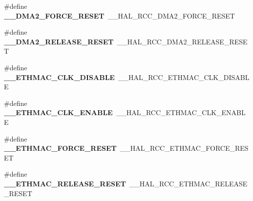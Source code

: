 \begin{DoxyCompactItemize}
\item 
\#define {\bfseries \+\_\+\+\_\+\+D\+M\+A2\+\_\+\+F\+O\+R\+C\+E\+\_\+\+R\+E\+S\+ET}~\+\_\+\+\_\+\+H\+A\+L\+\_\+\+R\+C\+C\+\_\+\+D\+M\+A2\+\_\+\+F\+O\+R\+C\+E\+\_\+\+R\+E\+S\+ET\hypertarget{group___h_a_l___r_c_c___aliased_gac4c41afd72bb5ab0fe1da7f4444ff213}{}\label{group___h_a_l___r_c_c___aliased_gac4c41afd72bb5ab0fe1da7f4444ff213}

\item 
\#define {\bfseries \+\_\+\+\_\+\+D\+M\+A2\+\_\+\+R\+E\+L\+E\+A\+S\+E\+\_\+\+R\+E\+S\+ET}~\+\_\+\+\_\+\+H\+A\+L\+\_\+\+R\+C\+C\+\_\+\+D\+M\+A2\+\_\+\+R\+E\+L\+E\+A\+S\+E\+\_\+\+R\+E\+S\+ET\hypertarget{group___h_a_l___r_c_c___aliased_gaea54267740103243fa99cba644aaffcc}{}\label{group___h_a_l___r_c_c___aliased_gaea54267740103243fa99cba644aaffcc}

\item 
\#define {\bfseries \+\_\+\+\_\+\+E\+T\+H\+M\+A\+C\+\_\+\+C\+L\+K\+\_\+\+D\+I\+S\+A\+B\+LE}~\+\_\+\+\_\+\+H\+A\+L\+\_\+\+R\+C\+C\+\_\+\+E\+T\+H\+M\+A\+C\+\_\+\+C\+L\+K\+\_\+\+D\+I\+S\+A\+B\+LE\hypertarget{group___h_a_l___r_c_c___aliased_ga66ef6d7fc598a25a812e475c9382a730}{}\label{group___h_a_l___r_c_c___aliased_ga66ef6d7fc598a25a812e475c9382a730}

\item 
\#define {\bfseries \+\_\+\+\_\+\+E\+T\+H\+M\+A\+C\+\_\+\+C\+L\+K\+\_\+\+E\+N\+A\+B\+LE}~\+\_\+\+\_\+\+H\+A\+L\+\_\+\+R\+C\+C\+\_\+\+E\+T\+H\+M\+A\+C\+\_\+\+C\+L\+K\+\_\+\+E\+N\+A\+B\+LE\hypertarget{group___h_a_l___r_c_c___aliased_ga13de83bd7b04abc2ea4b6c7475727318}{}\label{group___h_a_l___r_c_c___aliased_ga13de83bd7b04abc2ea4b6c7475727318}

\item 
\#define {\bfseries \+\_\+\+\_\+\+E\+T\+H\+M\+A\+C\+\_\+\+F\+O\+R\+C\+E\+\_\+\+R\+E\+S\+ET}~\+\_\+\+\_\+\+H\+A\+L\+\_\+\+R\+C\+C\+\_\+\+E\+T\+H\+M\+A\+C\+\_\+\+F\+O\+R\+C\+E\+\_\+\+R\+E\+S\+ET\hypertarget{group___h_a_l___r_c_c___aliased_ga68a672e5bd43e43c4c851f8d6b44c88c}{}\label{group___h_a_l___r_c_c___aliased_ga68a672e5bd43e43c4c851f8d6b44c88c}

\item 
\#define {\bfseries \+\_\+\+\_\+\+E\+T\+H\+M\+A\+C\+\_\+\+R\+E\+L\+E\+A\+S\+E\+\_\+\+R\+E\+S\+ET}~\+\_\+\+\_\+\+H\+A\+L\+\_\+\+R\+C\+C\+\_\+\+E\+T\+H\+M\+A\+C\+\_\+\+R\+E\+L\+E\+A\+S\+E\+\_\+\+R\+E\+S\+ET\hypertarget{group___h_a_l___r_c_c___aliased_gad4bf3cdd9d3a359b455185e90512517c}{}\label{group___h_a_l___r_c_c___aliased_gad4bf3cdd9d3a359b455185e90512517c}


\end{DoxyCompactItemize}

